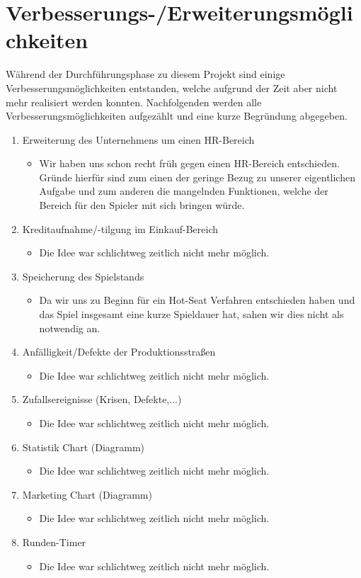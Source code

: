 \clearpage
\chapter{Verbesserungs-/Erweiterungsmöglichkeiten}
Während der Durchführungsphase zu diesem Projekt sind einige Verbesserungsmöglichkeiten entstanden, welche aufgrund der Zeit aber nicht mehr realisiert werden konnten. Nachfolgenden werden alle Verbesserungsmöglichkeiten aufgezählt und eine kurze Begründung abgegeben.
\begin{enumerate}
	\item Erweiterung des Unternehmens um einen HR-Bereich
\begin{itemize}
	\item Wir haben uns schon recht früh gegen einen HR-Bereich entschieden. Gründe hierfür sind zum einen der geringe Bezug zu unserer eigentlichen Aufgabe und zum anderen die mangelnden Funktionen, welche der Bereich für den Spieler mit sich bringen würde. 	
\end{itemize} 
	\item Kreditaufnahme/-tilgung im Einkauf-Bereich
\begin{itemize}
	\item Die Idee war schlichtweg zeitlich nicht mehr möglich.
\end{itemize} 
	\item Speicherung des Spielstands
\begin{itemize}
	\item Da wir uns zu Beginn für ein Hot-Seat Verfahren entschieden haben und das Spiel insgesamt eine kurze Spieldauer hat, sahen wir dies nicht als notwendig an.
\end{itemize} 
	\item Anfälligkeit/Defekte der Produktionsstraßen
\begin{itemize}
	\item Die Idee war schlichtweg zeitlich nicht mehr möglich.
\end{itemize} 
	\item Zufallsereignisse (Krisen, Defekte,...)
\begin{itemize}
	\item Die Idee war schlichtweg zeitlich nicht mehr möglich.
\end{itemize} 
	\item Statistik Chart (Diagramm) 
\begin{itemize}
	\item Die Idee war schlichtweg zeitlich nicht mehr möglich.
\end{itemize} 	
	\item Marketing Chart (Diagramm) 
\begin{itemize}
	\item Die Idee war schlichtweg zeitlich nicht mehr möglich.
\end{itemize}
	\item Runden-Timer
\begin{itemize}
	\item Die Idee war schlichtweg zeitlich nicht mehr möglich.
\end{itemize}
\end{enumerate}




